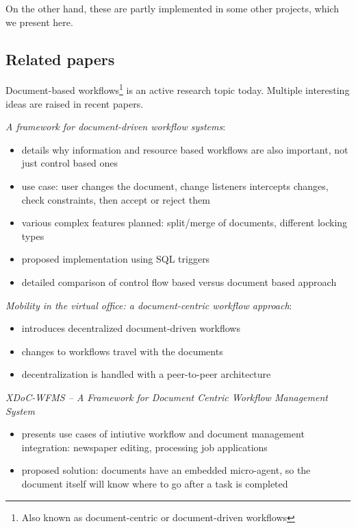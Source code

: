 On the other hand, these are partly implemented in some other projects, which we present here.

\subsection*{Related papers}

Document-based workflows\footnote{Also known as document-centric or
document-driven workflows} is an active research topic today. Multiple
interesting ideas are raised in recent papers.

\emph{A framework for document-driven workflow systems}\cite{paper-framework}:
\begin{itemize}
\item details why information and resource based workflows are also important, not just control based ones
\item use case: user changes the document, change listeners intercepts changes, check constraints, then accept or reject them
\item various complex features planned: split/merge of documents, different locking types
\item proposed implementation using SQL triggers
\item detailed comparison of control flow based versus document based approach
\end{itemize}

\emph{Mobility in the virtual office: a document-centric workflow approach}\cite{paper-mobility}:
\begin{itemize}
\item introduces decentralized document-driven workflows
\item changes to workflows travel with the documents
\item decentralization is handled with a peer-to-peer architecture
\end{itemize}

\emph{XDoC-WFMS -- A Framework for Document Centric Workflow Management System}\cite{paper-xdoc}
\begin{itemize}
\item presents use cases of intiutive workflow and document management integration: newspaper editing, processing job applications
\item proposed solution: documents have an embedded micro-agent, so the document itself will know where to go after a task is completed
\end{itemize}
